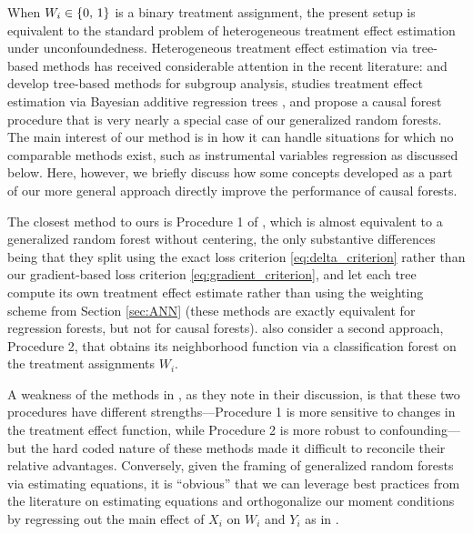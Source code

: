 \documentclass[aos]{imsart}
\theoremstyle{plain}
\theoremstyle{definition}
\theoremstyle{remark}
\begin{document}
\begin{CJK}{UTF8}{gbsn}
{When $W_i \in \left\{0, \, 1\right\}$ is a binary treatment assignment,
the present setup is equivalent to the standard problem of heterogeneous
treatment effect estimation under unconfoundedness.
Heterogeneous treatment effect estimation via tree-based methods has received considerable
attention in the recent literature: \citet{athey2016recursive} and \citet{su2009subgroup}
develop tree-based methods for subgroup analysis, \citet{hill2011bayesian}
studies treatment effect estimation via Bayesian additive regression trees
\citep{chipman2010bart}, and \citet{wager2015estimation} propose a causal forest
procedure that is very nearly a special case of our generalized random forests.
The main interest of our method is in how it can handle situations for which no
comparable methods exist, such as instrumental variables regression as discussed below.
Here, however, we briefly discuss how some concepts developed as a part of our more
general approach directly improve the performance of causal forests.

The closest method to ours is Procedure 1
of \citet{wager2015estimation}, which is almost equivalent to a generalized random forest without centering,
the only substantive differences being that they split using the exact loss
criterion \eqref{eq:delta_criterion} rather than our gradient-based loss criterion \eqref{eq:gradient_criterion},
and let each tree compute its own treatment effect estimate rather than using the weighting scheme
from Section \ref{sec:ANN} (these methods are exactly equivalent for regression forests, but not
for causal forests).
\citet{wager2015estimation} also consider a second approach, Procedure 2, that obtains its
neighborhood function via a classification forest on the treatment assignments $W_i$.

A weakness of the methods in \citet{wager2015estimation}, as they note in their discussion, is
that these two procedures have different strengths---Procedure 1 is more sensitive to changes
in the treatment effect function, while Procedure 2 is more robust to confounding---but the
hard coded nature of these methods made it difficult to reconcile their relative advantages.
Conversely, given the framing of generalized random forests via
estimating equations, it is ``obvious'' that we can leverage best practices from the literature
on estimating equations and orthogonalize our moment conditions by regressing
out the main effect of $X_i$ on $W_i$ and $Y_i$ as in \citet{robinson1988root}.

}
\end{CJK}
\end{document}
